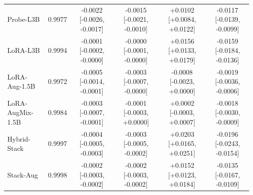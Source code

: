 \begin{table}[t]
\begin{tabular}{lccccc}
Probe-L3B & 0.9977 & -0.0022 [-0.0026, -0.0017] & -0.0015 [-0.0021, -0.0010] & +0.0102 [+0.0084, +0.0122] & -0.0117 [-0.0139, -0.0099] \\
LoRA-L3B & 0.9994 & -0.0001 [-0.0002, -0.0000] & -0.0000 [-0.0001, -0.0000] & +0.0156 [+0.0133, +0.0179] & -0.0159 [-0.0184, -0.0136] \\
LoRA-Aug-1.5B & 0.9972 & -0.0005 [-0.0014, -0.0001] & -0.0003 [-0.0007, -0.0000] & -0.0008 [-0.0023, +0.0000] & -0.0019 [-0.0036, -0.0006] \\
LoRA-AugMix-1.5B & 0.9984 & -0.0003 [-0.0007, -0.0001] & -0.0001 [-0.0003, +0.0000] & +0.0002 [-0.0003, +0.0007] & -0.0018 [-0.0030, -0.0009] \\
Hybrid-Stack & 0.9997 & -0.0004 [-0.0005, -0.0003] & -0.0003 [-0.0005, -0.0002] & +0.0203 [+0.0165, +0.0251] & -0.0196 [-0.0243, -0.0154] \\
Stack-Aug & 0.9998 & -0.0002 [-0.0003, -0.0002] & -0.0002 [-0.0003, -0.0002] & +0.0152 [+0.0123, +0.0184] & -0.0135 [-0.0167, -0.0109] \\
\bottomrule
\end{tabular}
\end{table}